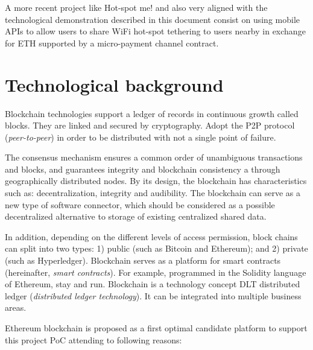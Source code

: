 \documentclass[12pt]{amsart}
\begin{document}
\begin{multicols}{2}
\vspace{0.35cm}

A more recent project like Hot-spot me!\cite{hotspotme}
and also very aligned with the technological demonstration
described in this document consist on using mobile
APIs to allow users to share WiFi hot-spot tethering
to users nearby in exchange for ETH supported by a
micro-payment channel contract.


\section{Technological background}\label{ch:bc}

\vspace{0.35cm}

Blockchain technologies support a ledger of records in
continuous growth called blocks.
They are linked and secured by
cryptography. Adopt the P2P protocol
(\textit{peer-to-peer}) in order to be distributed
with not a single point of failure.

\vspace{0.35cm}

The consensus mechanism ensures a common order
of unambiguous transactions and
blocks, and guarantees integrity and
blockchain consistency a
through geographically distributed nodes.
By its design, the blockchain has characteristics
such as: decentralization, integrity and audibility.
The blockchain can serve as a new
type of software connector, which should be considered
as a possible decentralized alternative to storage
of existing centralized shared data.

\vspace{0.35cm}

In addition, depending on the different levels of
access permission, block chains can
split into two types:
1) public (such as Bitcoin and Ethereum); and
2) private (such as Hyperledger). Blockchain serves
as a platform for smart contracts
(hereinafter, \textit{smart contracts}).
For example, programmed in the Solidity language of
Ethereum, stay and run.
Blockchain is a technology concept
DLT distributed ledger
(\textit{distributed ledger technology}).
It can be integrated into multiple business areas.

\vspace{0.35cm}

Ethereum
blockchain is proposed as a first optimal candidate platform
to support this project PoC attending to
following reasons:


\end{multicols}
\end{document}

